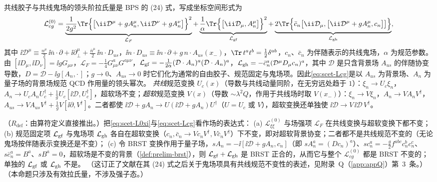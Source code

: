共线胶子与共线鬼场的领头阶拉氏量是 BPS 的 (24) 式\cite{BauerPirjolStewart2002}，写成坐标空间形式为
\begin{equation}\label{eq:scet-Lcg}
\mathcal L^{(0)}_{cg}=\underbrace{\frac{1}{2g^2}\Tr\Big\{\big[\ii\mathcal D^\mu+gA_n^\mu,\ii\mathcal D^\nu+gA_n^\nu\big]\Big\}^2}_{\mathcal L_F}
+\underbrace{\frac1\alpha\Tr\Big\{\big[\ii\mathcal D_\mu,A_n^\mu\big]\Big\}^2}_{\mathcal L_{\rm gf}}
+\underbrace{2\Tr\Big\{\bar c_n\big[\ii\mathcal D_\mu,\big[\ii\mathcal D^\mu+gA_n^\mu,c_n\big]\big]\Big\}}_{\mathcal L_{\rm gh}},
\end{equation}
其中 $\ii\mathcal D^\mu\equiv\frac{n^\mu}{2}\,\ii\bar n\cdot\partial+\ii\partial_\perp^\mu+\frac{\bar n^\mu}{2}\,\ii n\cdot D_{us}$，$\ii n\cdot D_{us}\equiv\ii n\cdot\partial+g\,n\cdot A_{us}(x_-)$，$\Tr\,t^at^b=\frac12\delta^{ab}$，$c_n$、$\bar c_n$ 为伴随表示的共线鬼场，$\alpha$ 为规范参数。由 $[\ii D_\mu,\ii D_\nu]=\ii gG_{\mu\nu}$，$\mathcal L_F=-\frac14G^a_{\mu\nu}G^{a\mu\nu}$，$\mathcal L_{\rm gf}=-\frac{1}{2\alpha}(\mathcal D\cdot A_n)^a(\mathcal D\cdot A_n)^a$，$\mathcal L_{\rm gh}=-\bar c_n^a(\mathcal D^\mu D_{\mu}c_n)^a$，其中 $\mathcal D$ 是只含背景场 $A_{us}$ 的伴随协变导数，$D=\mathcal D-\ii g[A_n,\cdot\,]$；$g\to0$、$A_{us}\to0$ 时它们化为通常的自由胶子、规范固定与鬼场项。因此\cref{eq:scet-Lcg}是以 $A_{us}$ 为背景场、$A_n$ 为量子场的背景场规范 QCD 作用量的领头幂次\cite{BauerPirjolStewart2002}。%
\emph{共线}规范变换 $U_c(x)$（导数与共线动量同阶，在无穷远处趋于 $1$）：$\xi_n\to U_c\xi_n$，$A_n\to U_cA_nU_c^\dagger+\frac1gU_c[\ii\mathcal D,U_c^\dagger]$，超软场不变；\emph{超软}规范变换 $V(x)$（导数 $\sim\lambda^2Q$，作用于共线场时取 $V(x_-)$）：$\xi_n\to V\xi_n$，$A_n\to VA_nV^\dagger$，$A_{us}\to VA_{us}V^\dagger+\frac1gV[\ii\partial,V^\dagger]$。二者都使 $\ii\mathcal D+gA_n\to U(\ii\mathcal D+gA_n)U^\dagger$（$U=U_c$ 或 $V$），超软变换还单独使 $\ii\mathcal D\to V\,\ii\mathcal D\,V^\dagger$。

\begin{proposition}\label{prop:scet-gauge}
（$R_{\mathrm{def}}$：由算符定义直接推出。）把\cref{eq:scet-L0xi}与\cref{eq:scet-Lcg}看作场的表达式：
(a) $\mathcal L^{(0)}_{\xi\xi}$ 与场强项 $\mathcal L_F$ 在共线变换与超软变换下都不变；
(b) 规范固定项 $\mathcal L_{\rm gf}$ 与鬼场项 $\mathcal L_{\rm gh}$ 各自在超软变换（$c_n,\bar c_n\to Vc_nV^\dagger,V\bar c_nV^\dagger$）下不变，即对超软背景协变；二者都不是共线规范不变的（无论鬼场按伴随表示变换还是不变）；
(c) 令 BRST 变换作用于量子场，$sA_n=-\ii[\ii\mathcal D+gA_n,c_n]$（即 $sA^a_n=(Dc_n)^a$）、$sc_n^a=-\frac g2f^{abc}c_n^bc_n^c$、$s\bar c_n^a=B^a$、$sB^a=0$，超软场是不变的背景（\cref{def:prelim-brst}），则 $\mathcal L_{\rm gf}+\mathcal L_{\rm gh}$ 是 BRST 正合的，从而它与整个 $\mathcal L^{(0)}_{cg}$ 都是 BRST 不变的；单独的 $\mathcal L_{\rm gf}$ 或 $\mathcal L_{\rm gh}$ 不是。
（这订正了文献\cite{BauerPirjolStewart2002}在其 (24) 式之后关于鬼场项具有共线规范不变性的表述，见附录~Q（\cref{app:appQ}）第~3~条。）（本命题只涉及有效拉氏量，不涉及强子态。）
\end{proposition}

